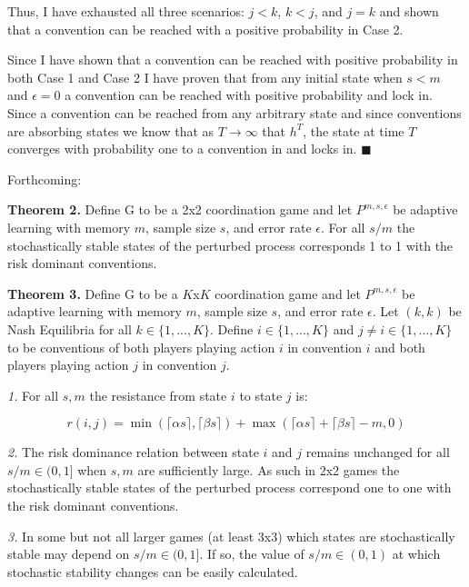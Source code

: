 \documentclass{article}
\begin{document}
\vskip12pt

Thus, I have exhausted all three scenarios: $j<k$, $k<j$, and $j=k$ and shown that a convention can be reached with a positive probability in Case 2.

\vskip18pt

Since I have shown that a convention can be reached with positive probability in both Case 1 and Case 2 I have proven that from any initial state when $s<m$ and $\epsilon=0$ a convention can be reached with positive probability and lock in. Since a convention can be reached from any arbitrary state and since conventions are absorbing states we know that as $T \rightarrow \infty$ that $h^T$, the state at time $T$ converges with probability one to a convention in and locks in. $\blacksquare$

\pagebreak

Forthcoming:

\textbf{Theorem 2.} Define G to be a 2x2 coordination game and let $P^{m,s,\epsilon}$ be adaptive learning with memory $m$, sample size $s$, and error rate $\epsilon$. For all $s/m$ the stochastically stable states of the perturbed process corresponds 1 to 1 with the risk dominant conventions.

\vskip12pt

\textbf{Theorem 3.} Define G to be a $K$x$K$ coordination game and let $P^{m,s,\epsilon}$ be adaptive learning with memory $m$, sample size $s$, and error rate $\epsilon$. Let $(k,k)$ be Nash Equilibria for all $k \in \{1,...,K\}$. Define $i \in \{1,...,K\}$ and $j \neq i \in \{1,...,K\}$ to be conventions of both players playing action $i$ in convention $i$ and both players playing action $j$ in convention $j$.

\textit{1.} For all $s, m$ the resistance from state $i$ to state $j$ is:

$$r(i,j)=\min(\lceil \alpha s \rceil,\lceil \beta s \rceil)+\max(\lceil \alpha s \rceil+\lceil \beta s \rceil-m,0)$$

\textit{2.} The risk dominance relation between state $i$ and $j$ remains unchanged for all $s/m \in (0,1]$ when $s,m$ are sufficiently large. As such in 2x2 games the stochastically stable states of the perturbed process correspond one to one with the risk dominant conventions.

\textit{3.} In some but not all larger games (at least 3x3) which states are stochastically stable may depend on $s/m \in (0,1]$. If so, the value of $s/m \in (0,1)$ at which stochastic stability changes can be easily calculated.




\end{document}
